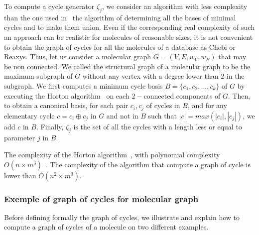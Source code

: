 \documentclass[10pt,letterpaper]{article}
\begin{document}

 To compute a cycle generator $\zeta_j$, we consider an algorithm with less complexity than the one used in~\cite{Vismara2000} the algorithm of determining all the bases of minimal cycles and to make them union. Even if the corresponding real complexity of such an approach can be realistic for molecules of reasonable sizes, it is not convenient to obtain the graph of cycles for all the molecules of a database as Chebi or Reaxys. Thus, let us consider a molecular graph $G=(V,E,w_V,w_E)$ that may be non connected. We called the structural graph of a molecular graph to be the maximum subgraph of $G$ without any vertex with a degree lower than $2$ in the subgraph. We first computes a minimum cycle basis $B=\{c_1,c_2,...,c_k  \}$  of  $G$ by executing the Horton algorithm~\cite{Horton1987} on each $2-$connected components of $G$. Then,  to obtain a canonical basis, for each pair $c_i, c_j$ of cycles in $B$, and for any elementary cycle $ c =  c_i \oplus c_j$ in $G$ and not in $B$ such that $|c| = max(|c_i|,|c_j|)$, we add $c$ in $B$. Finally, $\zeta_j$ is the set of all the cycles with a length less or equal  to parameter $j$ in $B$.
  
 The complexity of  the Horton algorithm~\cite{Horton1987}, with polynomial complexity  $O(n \times m^{3})$~\cite{Horton1987}. The complexity of the algorithm that compute a graph of cycle is lower than $O(n^2 \times m^{3})$.

\subsubsection*{Exemple of graph of cycles for molecular graph}


Before defining formally the graph of cycles, we illustrate and explain how to compute a graph of cycles of a molecule on two different examples.
\end{document}
